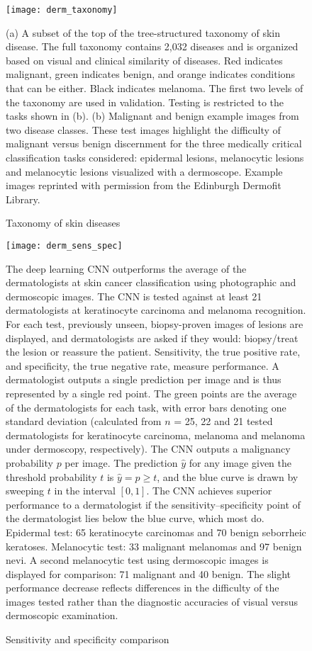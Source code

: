 \begin{figure}
\texttt{[image: derm\_taxonomy]}
\caption{Taxonomy of skin diseases}
\vspace{12px}
(a) A subset of the top of the tree-structured taxonomy of skin disease. The full taxonomy contains 2,032 diseases and is organized based on visual and clinical similarity of diseases. Red indicates malignant, green indicates benign, and orange indicates conditions that can be either. Black indicates melanoma. The first two levels of the taxonomy are used in validation. Testing is restricted to the tasks shown in (b). (b) Malignant and benign example images from two disease classes. These test images highlight the difficulty of malignant versus benign discernment for the three medically critical classification tasks considered: epidermal lesions, melanocytic lesions and melanocytic lesions visualized with a dermoscope. Example images reprinted with permission from the Edinburgh Dermofit Library.
\label{fig:derm_taxonomy}
\end{figure}

\begin{figure}
\texttt{[image: derm\_sens\_spec]}
\caption{Sensitivity and specificity comparison}
\vspace{12px}
The deep learning CNN outperforms the average of the dermatologists at skin cancer classification using photographic and dermoscopic images. The CNN is tested against at least 21 dermatologists at keratinocyte carcinoma and melanoma recognition. For each test, previously unseen, biopsy-proven images of lesions are displayed, and dermatologists are asked if they would: biopsy/treat the lesion or reassure the patient. Sensitivity, the true positive rate, and specificity, the true negative rate, measure performance. A dermatologist outputs a single prediction per image and is thus represented by a single red point. The green points are the average of the dermatologists for each task, with error bars denoting one standard deviation (calculated from $n$ = 25, 22 and 21 tested dermatologists for keratinocyte carcinoma, melanoma and melanoma under dermoscopy, respectively). The CNN outputs a malignancy probability $p$ per image. The prediction $\hat{y}$ for any image given the threshold probability $t$ is $\hat{y} = p \geq t$, and the blue curve is drawn by sweeping $t$ in the interval $[0, 1]$. The CNN achieves superior performance to a dermatologist if the sensitivity–specificity point of the dermatologist lies below the blue curve, which most do. Epidermal test: 65 keratinocyte carcinomas and 70 benign seborrheic keratoses. Melanocytic test: 33 malignant melanomas and 97 benign nevi. A second melanocytic test using dermoscopic images is displayed for comparison: 71 malignant and 40 benign. The slight performance decrease reflects differences in the difficulty of the images tested rather than the diagnostic accuracies of visual versus dermoscopic examination.
\label{fig:derm_sens_spec}
\end{figure}

